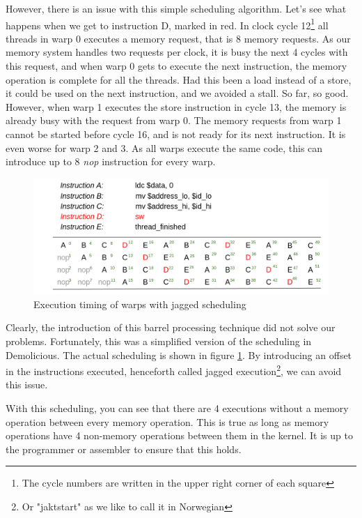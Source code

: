 \documentclass[../main/report.tex]{subfiles}
\begin{document}
However, there is an issue with this simple scheduling algorithm. Let's see what happens when we get to instruction D, marked in red. In clock cycle 12\footnote{The cycle numbers are written in the upper right corner of each square} all threads in warp 0 executes a memory request, that is 8 memory requests. 
As our memory system handles two requests per clock, it is busy the next 4 cycles with this request, and when warp 0 gets to execute the next instruction, the memory operation is complete for all the threads.
Had this been a load instead of a store, it could be used on the next instruction, and we avoided a stall.
So far, so good.
However, when warp 1 executes the store instruction in cycle 13, the memory is already busy with the request from warp 0.
The memory requests from warp 1 cannot be started before cycle 16, and is not ready for its next instruction. 
It is even worse for warp 2 and 3. As all warps execute the same code, this can introduce up to 8 \emph{nop} instruction for every warp.

\begin{figure}[htp]
\centering
\includegraphics[scale=0.25]{../gpu/diagrams/jaktstart_num.png}
\caption{Execution timing of warps with jagged scheduling}
\label{jagged}
\end{figure}

Clearly, the introduction of this barrel processing technique did not solve our problems.
Fortunately, this was a simplified version of the scheduling in Demolicious. 
The actual scheduling is shown in figure \ref{jagged}. 
By introducing an offset in the instructions executed, henceforth called jagged execution\footnote{Or "jaktstart" as we like to call it in Norwegian}, we can avoid this issue.

With this scheduling, you can see that there are 4 executions without a memory operation between every memory operation.
This is true as long as memory operations have 4 non-memory operations between them in the kernel.
It is up to the programmer or assembler to ensure that this holds.
\end{document}

